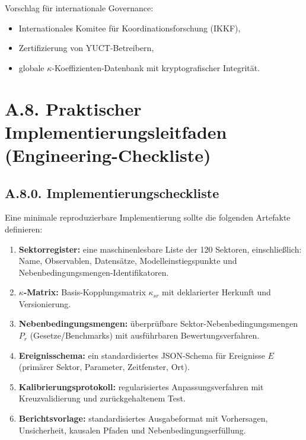 \documentclass[13pt,a4paper]{article}
\begin{document}
	Vorschlag für internationale Governance:
	\begin{itemize}[leftmargin=*]
		\item Internationales Komitee für Koordinationsforschung (IKKF),
		\item Zertifizierung von YUCT-Betreibern,
		\item globale $\kappa$-Koeffizienten-Datenbank mit kryptografischer Integrität.
	\end{itemize}
	
	\section*{A.8. Praktischer Implementierungsleitfaden (Engineering-Checkliste)}
	
	\subsection*{A.8.0. Implementierungscheckliste}
	Eine minimale reproduzierbare Implementierung sollte die folgenden Artefakte definieren:
	
	\begin{enumerate}[leftmargin=*]
		\item \textbf{Sektorregister:} eine maschinenlesbare Liste der 120 Sektoren, einschließlich: Name, Observablen, Datensätze, Modelleinstiegspunkte und Nebenbedingungsmengen-Identifikatoren.
		\item \textbf{$\kappa$-Matrix:} Basis-Kopplungsmatrix $\kappa_{sr}$ mit deklarierter Herkunft und Versionierung.
		\item \textbf{Nebenbedingungsmengen:} überprüfbare Sektor-Nebenbedingungsmengen $P_r$ (Gesetze/Benchmarks) mit ausführbaren Bewertungsverfahren.
		\item \textbf{Ereignisschema:} ein standardisiertes JSON-Schema für Ereignisse $E$ (primärer Sektor, Parameter, Zeitfenster, Ort).
		\item \textbf{Kalibrierungsprotokoll:} regularisiertes Anpassungsverfahren mit Kreuzvalidierung und zurückgehaltenem Test.
		\item \textbf{Berichtsvorlage:} standardisiertes Ausgabeformat mit Vorhersagen, Unsicherheit, kausalen Pfaden und Nebenbedingungserfüllung.
	\end{enumerate}
	
\end{document}
